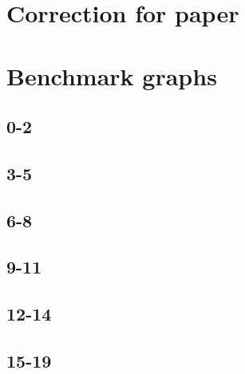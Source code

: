 \appendix

\section{Correction for paper}\label{sec:PaperCorrections}



\section{Benchmark graphs}
\subsection{0-2}
\resizebox{\textwidth}{!}{
    
    
}
\subsection{3-5}
\resizebox{\textwidth}{!}{
    
    
}
\subsection{6-8}
\resizebox{\textwidth}{!}{
    
    
}
\subsection{9-11}
\resizebox{\textwidth}{!}{
    
    
}
\subsection{12-14}
\resizebox{\textwidth}{!}{
    
    
}
\subsection{15-19}
\resizebox{\textwidth}{!}{
    
    
}